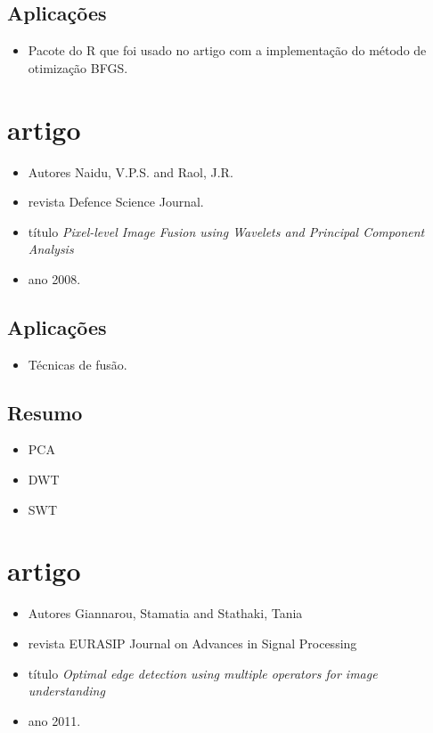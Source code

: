 \documentclass{article}
\begin{document}
\subsection{Aplicações}
\begin{itemize}
\item Pacote do R que foi usado no artigo com a implementação do método de otimização BFGS.
\end{itemize}

\section{artigo \cite{n_r}}
\begin{itemize}
\item Autores Naidu, V.P.S. and Raol, J.R.
\item revista Defence Science Journal.
\item título \textit{Pixel-level Image Fusion using Wavelets and Principal Component Analysis}
\item ano 2008.
\end{itemize}
\subsection{Aplicações}
\begin{itemize}
\item Técnicas de fusão.
\end{itemize}
\subsection{Resumo}
\begin{itemize}
\item PCA
\item DWT
\item SWT
\end{itemize}   

\section{artigo \cite{gs}}
\begin{itemize}
\item Autores Giannarou, Stamatia and Stathaki, Tania
\item revista EURASIP Journal on Advances in Signal Processing
\item título \textit{Optimal edge detection using multiple operators for image understanding}
\item ano 2011.
\end{itemize}
\end{document}
